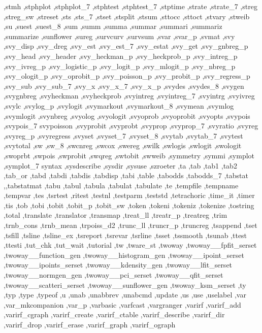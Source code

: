 {{    ,stmh ,stphplot ,stphplot_7 ,stphtest ,stphtest_7 ,stptime ,strate
    ,strate_7 ,streg ,streg_sw ,streset ,sts ,sts_7 ,stset ,stsplit
    ,stsum ,sttocc ,sttoct ,stvary ,stweib ,su ,suest ,suest_8 ,sum
    ,summ ,summa ,summar ,summari ,summariz ,summarize ,sunflower
    ,sureg ,survcurv ,survsum ,svar ,svar_p ,svmat ,svy ,svy_disp
    ,svy_dreg ,svy_est ,svy_est_7 ,svy_estat ,svy_get ,svy_gnbreg_p
    ,svy_head ,svy_header ,svy_heckman_p ,svy_heckprob_p ,svy_intreg_p
    ,svy_ivreg_p ,svy_logistic_p ,svy_logit_p ,svy_mlogit_p ,svy_nbreg_p
    ,svy_ologit_p ,svy_oprobit_p ,svy_poisson_p ,svy_probit_p
    ,svy_regress_p ,svy_sub ,svy_sub_7 ,svy_x ,svy_x_7 ,svy_x_p ,svydes
    ,svydes_8 ,svygen ,svygnbreg ,svyheckman ,svyheckprob ,svyintreg
    ,svyintreg_7 ,svyintrg ,svyivreg ,svylc ,svylog_p ,svylogit
    ,svymarkout ,svymarkout_8 ,svymean ,svymlog ,svymlogit ,svynbreg
    ,svyolog ,svyologit ,svyoprob ,svyoprobit ,svyopts ,svypois
    ,svypois_7 svypoisson ,svyprobit ,svyprobt ,svyprop ,svyprop_7
    ,svyratio ,svyreg ,svyreg_p ,svyregress ,svyset ,svyset_7 ,svyset_8
    ,svytab ,svytab_7 ,svytest ,svytotal ,sw ,sw_8 ,swcnreg ,swcox
    ,swereg ,swilk ,swlogis ,swlogit ,swologit ,swoprbt ,swpois
    ,swprobit ,swqreg ,swtobit ,swweib ,symmetry ,symmi ,symplot
    ,symplot_7 syntax ,sysdescribe ,sysdir ,sysuse ,szroeter ,ta ,tab
    ,tab1 ,tab2 ,tab_or ,tabd ,tabdi ,tabdis ,tabdisp ,tabi ,table
    ,tabodds ,tabodds_7 ,tabstat ,,tabstatmat ,tabu ,tabul ,tabula ,tabulat ,tabulate
    ,te ,tempfile ,tempname ,tempvar ,tes ,tsrtest ,ritest ,testnl ,testparm
    ,teststd ,tetrachoric ,time_it ,timer ,tis ,tob ,tobi ,tobit
    ,tobit_p ,tobit_sw ,token ,tokeni ,tokeniz ,tokenize ,tostring
    ,total ,translate ,translator ,transmap ,treat_ll ,treatr_p
    ,treatreg ,trim ,trnb_cons ,trnb_mean ,trpoiss_d2 ,trunc_ll
    ,truncr_p ,truncreg ,tsappend ,tset ,tsfill ,tsline ,tsline_ex
    ,tsreport ,tsrevar ,tsrline ,tsset ,tssmooth ,tsunab ,ttest
    ,ttesti ,tut_chk ,tut_wait ,tutorial ,tw ,tware_st ,twoway
    ,twoway__fpfit_serset ,twoway__function_gen ,twoway__histogram_gen
    ,twoway__ipoint_serset ,twoway__ipoints_serset ,twoway__kdensity_gen
    ,twoway__lfit_serset ,twoway__normgen_gen ,twoway__pci_serset
    ,twoway__qfit_serset ,twoway__scatteri_serset ,twoway__sunflower_gen
    ,twoway_ksm_serset ,ty ,typ ,type ,typeof ,u ,unab ,unabbrev
    ,unabcmd ,update ,us ,use ,uselabel ,var ,var_mkcompanion
    ,var_p ,varbasic ,varfcast ,vargranger ,varirf ,varirf_add
    ,varirf_cgraph ,varirf_create ,varirf_ctable ,varirf_describe
    ,varirf_dir ,varirf_drop ,varirf_erase ,varirf_graph ,varirf_ograph
}}
